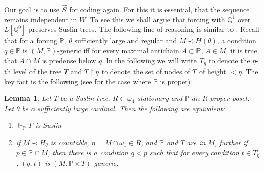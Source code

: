 \documentclass[a4paper,12pt]{article}
\newtheorem{lemma}[theorem]{Lemma}
\newcommand{\forceP}{\mathbb{P}}
\newcommand{\forceQ}{\mathbb{Q}}
\begin{document}
Our goal is to use $\vec{S}$ for coding again. For this it is essential, that the sequence remains independent in $W$. To see this we shall argue that forcing with $\mathbb{Q}^1$ over $L[\forceQ^0]$ preserves Suslin trees. 
The following  line of reasoning is similar to \cite{Ho}.
Recall that for a forcing $\forceP$, $\theta$ sufficiently large and regular and $M \prec H(\theta)$, a condition $q \in \forceP$ is $(M,\forceP)$-generic iff for every maximal antichain $A \subset \forceP$, $A \in M$, it is true that $ A \cap M$ is predense below $q$. In the following we will write $T_{\eta}$ to denote the $\eta$-th level of the tree $T$ and $T \upharpoonright \eta$ to denote the set of nodes of $T$ of height $< \eta$.
The key fact is the following (see \cite{Miyamoto2} for the case where $\forceP$ is proper)
\begin{lemma}\label{preservation of Suslin trees}
 Let $T$ be a Suslin tree, $R \subset \omega_1$ stationary and $\forceP$ an $R$-proper
 poset. Let $\theta$ be a sufficiently large cardinal.
 Then the following are equivalent:
 \begin{enumerate}
  \item $\Vdash_{\forceP} T$ is Suslin
 
  \item if $M \prec H_{\theta}$ is countable, $\eta = M \cap \omega_1 \in R$, and $\forceP$ and $T$ are in $M$,
  further if $p \in \forceP \cap M$, then there is a condition $q<p$ such that 
  for every condition $t \in T_{\eta}$, 
  $(q,t)$ is $(M, \forceP \times T)$-generic.
 \end{enumerate}

\end{lemma}
\end{document}
